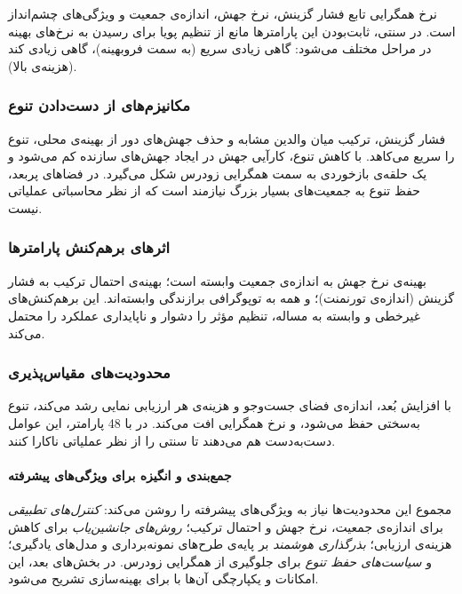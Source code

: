 نرخ همگرايی تابع فشار گزينش، نرخ جهش، اندازه‌ی جمعيت و ويژگی‌های چشم‌انداز است. در  سنتی، ثابت‌بودن اين پارامترها مانع از تنظيم پويا برای رسيدن به نرخ‌های بهينه در مراحل مختلف می‌شود: گاهی زيادی سريع (به سمت فروبهينه)، گاهی زيادی کند (هزينه‌ی بالا).

\subsubsection{مکانيزم‌های از دست‌دادن تنوع}

فشار گزينش، ترکيب ميان والدين مشابه و حذف جهش‌های دور از بهينه‌ی محلی، تنوع را سريع می‌کاهد. با کاهش تنوع، کارآيی جهش در ايجاد جهش‌های سازنده کم می‌شود و يک حلقه‌ی بازخوردی به سمت همگرايی زودرس شکل می‌گيرد. در فضاهای پربعد، حفظ تنوع به جمعيت‌های بسيار بزرگ نيازمند است که از نظر محاسباتی عملياتی نيست.

\subsubsection{اثرهای برهم‌کنش پارامترها}

بهينه‌ی نرخ جهش به اندازه‌ی جمعيت وابسته است؛ بهينه‌ی احتمال ترکيب به فشار گزينش (اندازه‌ی تورنمنت)؛ و همه به توپوگرافی برازندگی وابسته‌اند. اين برهم‌کنش‌های غيرخطی و وابسته به مساله، تنظيم مؤثر را دشوار و ناپايداری عملکرد را محتمل می‌کند.

\subsubsection{محدوديت‌های مقياس‌پذيری}

با افزايش بُعد، اندازه‌ی فضای جست‌وجو و هزينه‌ی هر ارزيابی نمايی رشد می‌کند، تنوع به‌سختی حفظ می‌شود، و نرخ همگرايی افت می‌کند. در  با 48 پارامتر، اين عوامل دست‌به‌دست هم می‌دهند تا  سنتی را از نظر عملیاتی ناکارا کنند.

\paragraph{جمع‌بندی و انگيزه برای ويژگی‌های پيشرفته}
مجموع اين محدوديت‌ها نياز به ويژگی‌های پيشرفته را روشن می‌کند: \emph{کنترل‌های تطبيقی} برای اندازه‌ی جمعيت، نرخ جهش و احتمال ترکيب؛ \emph{روش‌های جانشين‌ياب} برای کاهش هزينه‌ی ارزيابی؛ \emph{بذرگذاری هوشمند} بر پايه‌ی طرح‌های نمونه‌برداری و مدل‌های يادگيری؛ و \emph{سياست‌های حفظ تنوع} برای جلوگيری از همگرايی زودرس. در بخش‌های بعد، اين امکانات و يکپارچگی آن‌ها با  برای بهينه‌سازی  تشريح می‌شود.






